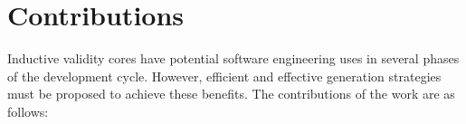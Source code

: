 \section{Contributions}
 Inductive validity cores have potential software engineering uses in several phases of the development cycle. However, efficient and effective generation strategies must be proposed to achieve these benefits. The contributions of the work are as follows:
